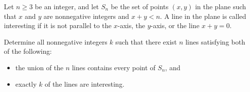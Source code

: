 Let $n\geq 3$ be an integer, and let $S_n$ be the set of points $(x,y)$ in the plane such that $x$ and $y$ are nonnegative integers and $x+y<n$. A line in the plane is called interesting if it is not parallel to the $x$-axis, the $y$-axis, or the line $x+y=0$.

Determine all nonnegative integers $k$ such that there exist $n$ lines satisfying both of the following:
\begin{itemize}
\item the union of the $n$ lines contains every point of $S_n$, and
\item exactly $k$ of the lines are interesting.
\end{itemize}
